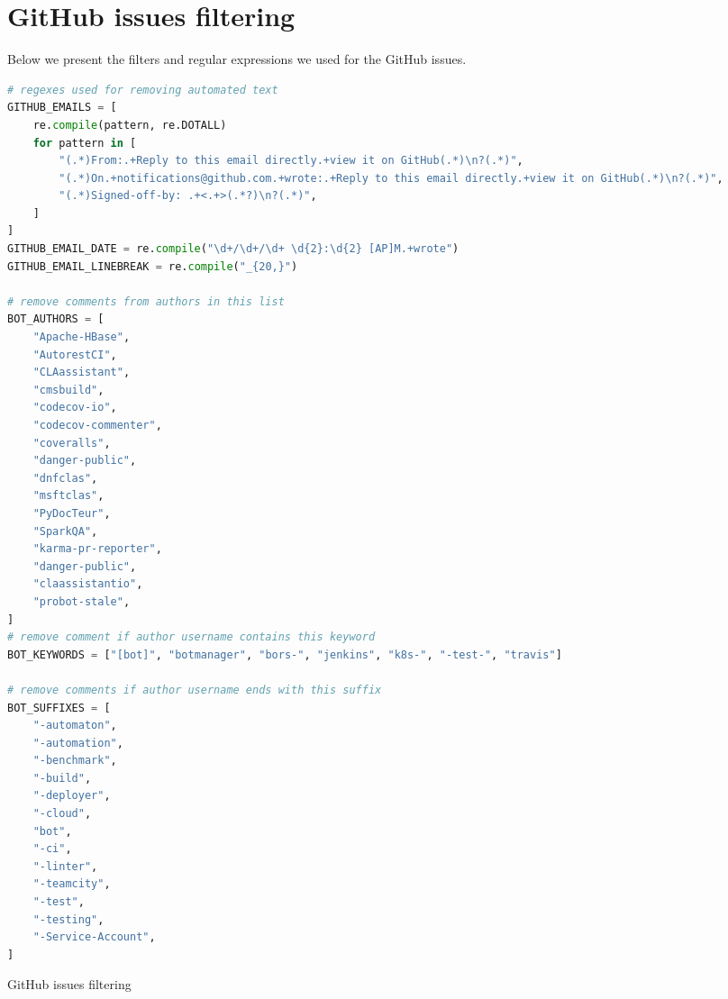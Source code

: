 \documentclass[10pt]{article} %
\begin{document}


\setcounter{figure}{0}  
\setcounter{table}{0}
\setcounter{equation}{0}
\setcounter{lstfloat}{0}


\section{GitHub issues filtering}
\label{sec:issues_data}
Below we present the filters and regular expressions we used for the GitHub issues. 
\begin{lstfloat}
\begin{lstlisting}[language=python] 
# regexes used for removing automated text
GITHUB_EMAILS = [
    re.compile(pattern, re.DOTALL)
    for pattern in [
        "(.*)From:.+Reply to this email directly.+view it on GitHub(.*)\n?(.*)",
        "(.*)On.+notifications@github.com.+wrote:.+Reply to this email directly.+view it on GitHub(.*)\n?(.*)",
        "(.*)Signed-off-by: .+<.+>(.*?)\n?(.*)",
    ]
]
GITHUB_EMAIL_DATE = re.compile("\d+/\d+/\d+ \d{2}:\d{2} [AP]M.+wrote")
GITHUB_EMAIL_LINEBREAK = re.compile("_{20,}")

# remove comments from authors in this list
BOT_AUTHORS = [
    "Apache-HBase",
    "AutorestCI",
    "CLAassistant",
    "cmsbuild",
    "codecov-io",
    "codecov-commenter",
    "coveralls",
    "danger-public",
    "dnfclas",
    "msftclas",
    "PyDocTeur",
    "SparkQA",
    "karma-pr-reporter",
    "danger-public",
    "claassistantio",
    "probot-stale",
]
# remove comment if author username contains this keyword
BOT_KEYWORDS = ["[bot]", "botmanager", "bors-", "jenkins", "k8s-", "-test-", "travis"]

# remove comments if author username ends with this suffix
BOT_SUFFIXES = [
    "-automaton",
    "-automation",
    "-benchmark",
    "-build",
    "-deployer",
    "-cloud",
    "bot",
    "-ci",
    "-linter",
    "-teamcity",
    "-test",
    "-testing",
    "-Service-Account",
]
\end{lstlisting}
\caption{GitHub issues filtering}
\label{lst:issues}
\end{lstfloat}
\end{document}
